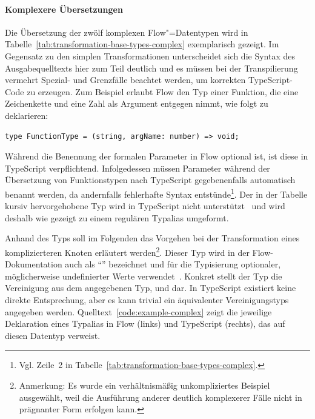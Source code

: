 \vspace{-0.5\baselineskip}
\paragraph{Komplexere Übersetzungen}

Die Übersetzung der zwölf komplexen Flow"=Datentypen wird in Tabelle~\ref{tab:transformation-base-types-complex} exemplarisch gezeigt. Im Gegensatz zu den simplen Transformationen unterscheidet sich die Syntax des Ausgabequelltexts hier zum Teil deutlich und es müssen bei der Transpilierung vermehrt Spezial- und Grenzfälle beachtet werden, um korrekten TypeScript-Code zu erzeugen. Zum Beispiel erlaubt Flow den Typ einer Funktion, die eine Zeichenkette und eine Zahl als Argument entgegen nimmt, wie folgt zu deklarieren:

\begin{lstlisting}[numbers=none]
type FunctionType = (string, argName: number) => void;
\end{lstlisting}

Während die Benennung der formalen Parameter in Flow optional ist, ist diese in TypeScript verpflichtend. Infolgedessen müssen Parameter während der Übersetzung von Funktionstypen nach TypeScript gegebenenfalls automatisch benannt werden, da andernfalls fehlerhafte Syntax entstünde\footnote{Vgl. Zeile~2 in Tabelle~\ref{tab:transformation-base-types-complex}.}.
Der in der Tabelle kursiv hervorgehobene Typ  wird in TypeScript nicht unterstützt~\autocite{TS:GITHUB:NO_OPAQUE_TYPE} und wird deshalb wie gezeigt zu einem regulären Typalias umgeformt.

\tablespace


Anhand des Typs  soll im Folgenden das Vorgehen bei der Transformation eines komplizierteren Knoten erläutert werden\footnote{Anmerkung: Es wurde ein verhältnismäßig unkompliziertes Beispiel ausgewählt, weil die Ausführung anderer deutlich komplexerer Fälle nicht in prägnanter Form erfolgen kann.}. Dieser Typ wird in der Flow-Dokumentation auch als \enquote{} bezeichnet und für die Typisierung optionaler, möglicherweise undefinierter Werte verwendet~\autocite{FLOW:MAYBE_TYPES}. Konkret stellt der Typ die Vereinigung aus dem angegebenen Typ,  und  dar. In TypeScript existiert keine direkte Entsprechung, aber es kann trivial ein äquivalenter Vereinigungstyps angegeben werden. Quelltext~\ref{code:example-complex} zeigt die jeweilige Deklaration eines Typalias in Flow (links) und TypeScript (rechts), das auf diesen Datentyp verweist.

